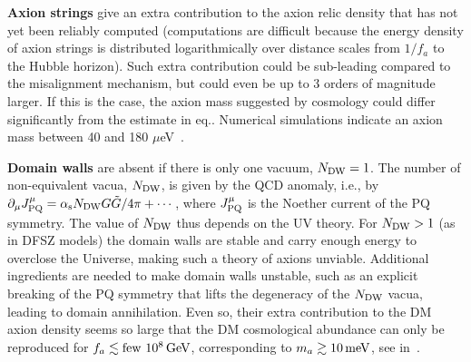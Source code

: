 {\bf Axion strings} give an extra contribution to the axion relic density that has not yet been
reliably computed (computations are difficult because the energy density of axion strings is distributed
logarithmically over distance scales from $1/f_a$ to the Hubble horizon).
Such extra contribution could be sub-leading compared to the misalignment mechanism, but could even be up to 3 orders of magnitude larger.
If this is the case, the axion mass suggested by cosmology could differ significantly from the estimate in eq..
Numerical simulations indicate an axion mass between 40 and 180 $\mu$eV~\cite{axionDM}.

\smallskip

{\bf Domain walls} are absent if there is only one vacuum, $N_{\rm DW}=1$.
The number of non-equivalent vacua, $N_{\rm DW}$, is given by the QCD anomaly, i.e., by $\partial_\mu J^\mu_{\rm PQ}=\alpha_{\rm s} N_{\rm DW} G\tilde G/4\pi +\cdots$, where $J^\mu_{\rm PQ}$ is the Noether current of the PQ symmetry. 
The value of $N_{\rm DW}$ thus depends on the UV theory. 
For $N_{\rm DW}>1$ (as in DFSZ models) the domain walls are stable and carry enough energy to overclose the Universe, making such a theory of axions unviable.
Additional ingredients are needed to make domain walls unstable, 
such as an explicit breaking of the PQ symmetry that lifts the degeneracy of the $N_{\rm DW}$ vacua,
leading to domain annihilation.
Even so, their extra contribution to the DM axion density seems so large 
that the DM cosmological abundance can only be reproduced for $f_a \lesssim {\rm few}~10^{8}\,{\rm GeV}$, 
corresponding to $m_a \gtrsim 10 \,{\rm meV}$,
see  in~\cite{axionDM}.



\medskip

